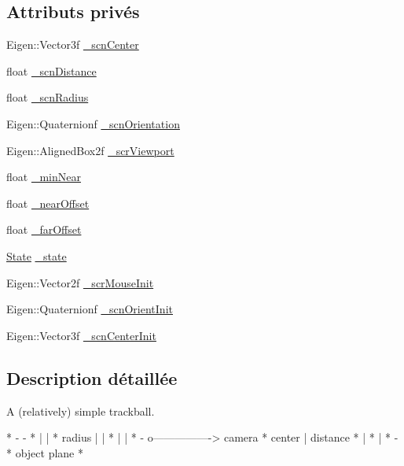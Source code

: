 \subsection*{Attributs privés}
\begin{DoxyCompactItemize}
\item 
Eigen\+::\+Vector3f \hyperlink{class_trackball_ae7fde591bbfcfe0fe9af9cf3b79c5665}{\+\_\+scn\+Center}
\item 
float \hyperlink{class_trackball_a6b4c24a27f219bad3b309d6cfcc3cec8}{\+\_\+scn\+Distance}
\item 
float \hyperlink{class_trackball_a308ba1b945ed2c6fdb008db88813afad}{\+\_\+scn\+Radius}
\item 
Eigen\+::\+Quaternionf \hyperlink{class_trackball_a30efdceb6156ee673db955c6cc0a00f8}{\+\_\+scn\+Orientation}
\item 
Eigen\+::\+Aligned\+Box2f \hyperlink{class_trackball_aec324aef6388b1e9bed7b47572e2f0b3}{\+\_\+scr\+Viewport}
\item 
float \hyperlink{class_trackball_a9130004320d2ebca9aee340403513f41}{\+\_\+min\+Near}
\item 
float \hyperlink{class_trackball_a08e3d5e8358c166c29d015f36c998bd1}{\+\_\+near\+Offset}
\item 
float \hyperlink{class_trackball_aafee1403bc2961498e3df496b787679a}{\+\_\+far\+Offset}
\item 
\hyperlink{class_trackball_a102216413a87cb37801044063a1b05be}{State} \hyperlink{class_trackball_a138a8078de8d43d681e6b377166333a1}{\+\_\+state}
\item 
Eigen\+::\+Vector2f \hyperlink{class_trackball_a0e5ae9d56df6bd61bb3e05c017bee133}{\+\_\+scr\+Mouse\+Init}
\item 
Eigen\+::\+Quaternionf \hyperlink{class_trackball_a4a6fb95a1c6cbb60fa11288cbe83e70a}{\+\_\+scn\+Orient\+Init}
\item 
Eigen\+::\+Vector3f \hyperlink{class_trackball_a90663027f06115f88a1045c1870f4531}{\+\_\+scn\+Center\+Init}
\end{DoxyCompactItemize}


\subsection{Description détaillée}
A (relatively) simple trackball. 

\begin{DoxyVerb}*        -  -
*        |  |
* radius |  |
*        |  |
*        -  o----------------> camera
*    center |    distance
*           |
*           |
*           -
 *     object plane
* \end{DoxyVerb}


